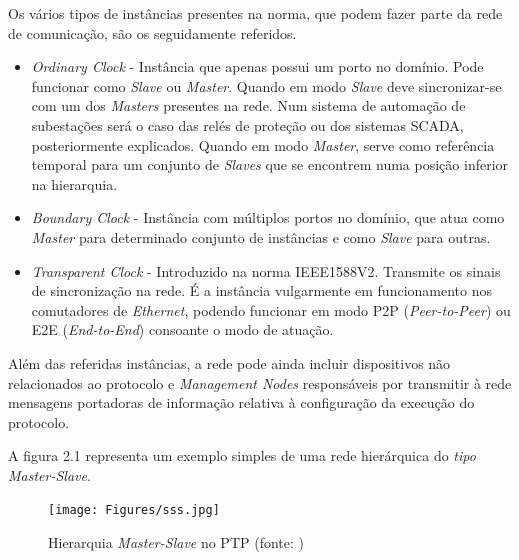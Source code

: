 Os vários tipos de instâncias presentes na norma, que podem fazer parte da rede de comunicação, são os seguidamente referidos. 

\begin{itemize}
  \item \textit{Ordinary Clock}  - \quad Instância que apenas possui um porto no domínio. Pode funcionar como \textit{Slave} ou \textit{Master}. Quando em modo \textit{Slave} deve sincronizar-se com um dos \textit{Masters} presentes na rede. Num sistema de automação
  de subestações será o caso das relés de proteção ou dos sistemas SCADA, posteriormente explicados. 
  Quando em modo \textit{Master}, serve como referência temporal para um conjunto de \textit{Slaves} que se encontrem numa posição inferior na hierarquia.
  \item \textit{Boundary Clock}  - \quad Instância com múltiplos portos no domínio, que atua como \textit{Master} para determinado conjunto de instâncias e como \textit{Slave} para outras.
  \item \textit{Transparent Clock} - \quad Introduzido na norma IEEE1588V2. Transmite os sinais de sincronização na rede. É a instância vulgarmente em funcionamento nos comutadores de \textit{Ethernet}, podendo funcionar em modo P2P (\textit{Peer-to-Peer}) ou E2E (\textit{End-to-End}) consoante o modo de atuação.
\end{itemize}

Além das referidas instâncias, a rede pode ainda incluir dispositivos não relacionados ao protocolo e \textit{Management Nodes} responsáveis por transmitir à rede mensagens portadoras de informação relativa à configuração da execução do protocolo. \par
A figura 2.1 representa um exemplo simples de uma rede hierárquica do \textit{tipo Master-Slave}.

\begin{figure}[!htb]
  \centering
  \texttt{[image: Figures/sss.jpg]}
  \caption[Hierarquia \textit{Master-Slave} no PTP]{Hierarquia \textit{Master-Slave} no PTP (fonte: \cite{PTP2019})}
  \label{fig:airbus1}
\end{figure}


